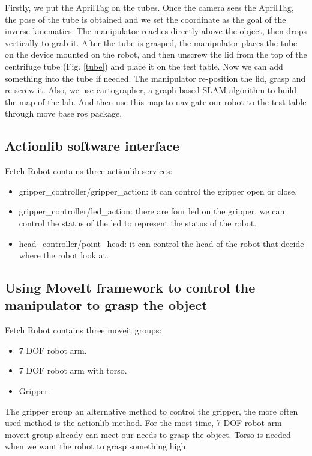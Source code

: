 \documentclass[12pt,draftclsnofoot,onecolumn]{IEEEtran}
\begin{document}
	
	Firstly, we put the AprilTag on the tubes. Once the camera sees the AprilTag, the pose of the tube is obtained and we set the coordinate
	as the goal of the inverse kinematics. The manipulator reaches directly above the object, then drops vertically to grab it. 
	After the tube is grasped, the manipulator places the tube on the device mounted on the robot,
	and then unscrew the lid from the top of the centrifuge tube (Fig. \ref{tube}) and place it on the test table.
	Now we can add something into the tube if needed.
	The manipulator re-position the lid, grasp and re-screw it. 
	Also, we use cartographer, a graph-based SLAM algorithm to build the map of the lab. And then use this map to navigate our robot 
	to the test table through move base ros package.
	
	\subsection{Actionlib software interface}
	Fetch Robot contains three actionlib services:
	\begin{itemize}
	\item \/gripper\_controller/gripper\_action: it can control the gripper open or close.
	\item \/gripper\_controller/led\_action: there are four led on the gripper, we can control the status of the led to represent the status of the robot.
	\item \/head\_controller/point\_head: it can control the head of the robot that decide where the robot look at.
	\end{itemize}
	
	
	\subsection{Using MoveIt framework to control the manipulator to grasp the object}
	Fetch Robot contains three moveit groups:  
	\begin{itemize}
	\item 7 DOF robot arm.
	\item 7 DOF robot arm with torso.
	\item Gripper.
	\end{itemize}
	
	The gripper group an alternative method to control the gripper, the more often used method is the actionlib method.
	For the most time, 7 DOF robot arm moveit group already can meet our needs to grasp the object. Torso is needed when we want the robot to grasp something high.
	
\end{document}
